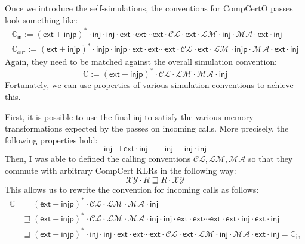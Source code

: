 \documentclass[11pt]{article}
\begin{document}
Once we introduce the self-simulations,
the conventions for CompCertO passes look something like:
\begin{gather*}
  \mathbb{C}_\mathsf{in} :=
    (\mathsf{ext} + \mathsf{injp})^* \cdot
    \mathsf{inj} \cdot
    \mathsf{inj} \cdot
    \mathsf{ext} \cdot
    \mathsf{ext} \cdots
    \mathsf{ext} \cdot
    \mathcal{C\!L} \cdot
    \mathsf{ext} \cdot
    \mathcal{L\!M} \cdot
    \mathsf{inj} \cdot
    \mathcal{M\!A} \cdot
    \mathsf{ext} \cdot
    \mathsf{inj}
    \\
  \mathbb{C}_\mathsf{out} :=
    (\mathsf{ext} + \mathsf{injp})^* \cdot
    \mathsf{injp} \cdot
    \mathsf{injp} \cdot
    \mathsf{ext} \cdot
    \mathsf{ext} \cdots
    \mathsf{ext} \cdot
    \mathcal{C\!L} \cdot
    \mathsf{ext} \cdot
    \mathcal{L\!M} \cdot
    \mathsf{injp} \cdot
    \mathcal{M\!A} \cdot
    \mathsf{ext} \cdot
    \mathsf{inj}
\end{gather*}
Again, they need to be matched against the overall simulation convention:
\[
  \mathbb{C} :=
  (\mathsf{ext} + \mathsf{injp})^* \cdot
  \mathcal{C\!L} \cdot
  \mathcal{L\!M} \cdot
  \mathcal{M\!A} \cdot
  \mathsf{inj}
\]
Fortunately,
we can use properties of various simulation conventions to achieve this.

First,
it is possible to use the final $\mathsf{inj}$
to satisfy the various memory transformations
expected by the passes on incoming calls.
More precisely,
the following properties hold:
\[
  \mathsf{inj} \sqsupseteq \mathsf{ext} \cdot \mathsf{inj}
  \qquad
  \mathsf{inj} \sqsupseteq \mathsf{inj} \cdot \mathsf{inj}
\]
Then,
I was able to defined the calling conventions
$\mathcal{C\!L}, \mathcal{L\!M}, \mathcal{M\!A}$
so that they commute with arbitrary CompCert KLRs
in the following way:
\[
  \mathcal{X\!Y} \cdot R
  \sqsupseteq
  R \cdot \mathcal{X\!Y}
\]
This allows us to rewrite the convention for incoming calls
as follows:
\begin{align*}
  \mathbb{C} &=
    (\mathsf{ext} + \mathsf{injp})^* \cdot
    \mathcal{C\!L} \cdot
    \mathcal{L\!M} \cdot
    \mathcal{M\!A} \cdot
    \mathsf{inj} \\
  &\sqsupseteq
    (\mathsf{ext} + \mathsf{injp})^* \cdot
    \mathcal{C\!L} \cdot
    \mathcal{L\!M} \cdot
    \mathcal{M\!A} \cdot
    \mathsf{inj} \cdot
    \mathsf{inj} \cdot
    \mathsf{ext} \cdot
    \mathsf{ext} \cdots
    \mathsf{ext} \cdot
    \mathsf{ext} \cdot
    \mathsf{inj} \cdot
    \mathsf{ext} \cdot
    \mathsf{inj} \\
  &\sqsupseteq
    (\mathsf{ext} + \mathsf{injp})^* \cdot
    \mathsf{inj} \cdot
    \mathsf{inj} \cdot
    \mathsf{ext} \cdot
    \mathsf{ext} \cdots
    \mathsf{ext} \cdot
    \mathcal{C\!L} \cdot
    \mathsf{ext} \cdot
    \mathcal{L\!M} \cdot
    \mathsf{inj} \cdot
    \mathcal{M\!A} \cdot
    \mathsf{ext} \cdot
    \mathsf{inj}
  =
    \mathbb{C}_\mathsf{in}
\end{align*}
\end{document}
